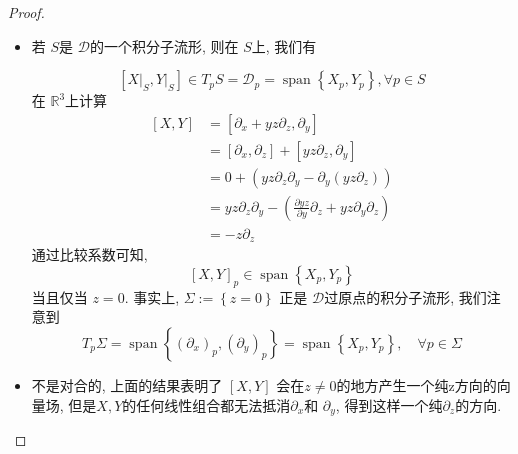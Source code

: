 \documentclass[../main.tex]{subfiles}
\begin{document}
\begin{proof}
    \begin{itemize}
        \item[a).] 若 \(  S  \)是 \(  \mathcal{D}  \)的一个积分子流形, 则在 \(  S  \)上, 我们有
        
    \[
    \left[ \left. X \right|_{S}, \left. Y \right|_{S} \right]\in T_{p}S= \mathcal{D}_{p}= \operatorname{span}\left\{ X_{p},Y_{p} \right\},\forall p\in S 
    \]
    在 \(  \mathbb{R} ^{3}  \)上计算
    \[
   \begin{aligned}
    \left[ X,Y \right]&= [ \partial _{x}+ yz \partial _{z}, \partial _{y}] \\&= [ \partial _{x}, \partial _{z}]+ \left[ yz \partial _{z}, \partial _{y} \right]\\&= 0+ \left( yz \partial _{z} \partial _{y}-  \partial _{y}\left( yz  \partial _{z} \right)  \right)\\&= yz \partial _{z} \partial _{y}- \left( \frac{\partial yz}{\partial y}  \partial _{z}+ yz  \partial _{y} \partial _{z} \right)\\&= -z \partial _{z}   
   \end{aligned} 
    \] 通过比较系数可知, 
    \[
    [X,Y]_{p}\in \operatorname{span}\left\{ X_{p},Y_{p} \right\}
    \]当且仅当  \(  z= 0  \). 
    事实上,  \(   \Sigma := \left\{ z= 0 \right\}  \)  正是 \(  \mathcal{D}  \)过原点的积分子流形, 我们注意到
    \[
    T_{p} \Sigma = \operatorname{span}\left\{  \left( \partial _{x} \right)_{p} , \left( \partial _{y}  \right)_{p} \right\}= \operatorname{span}\left\{ X_{p},Y_{p} \right\},\quad \forall p\in  \Sigma 
    \] 
    \item[b).] 不是对合的, 上面的结果表明了 \(  \left[ X,Y \right]   \) 会在\(  z\neq 0  \)的地方产生一个纯z方向的向量场, 但是\(  X,Y  \)的任何线性组合都无法抵消\(   \partial _{x}  \)和 \(   \partial _{y}  \), 得到这样一个纯\(   \partial _{z}  \)的方向.     
    \end{itemize}
\end{proof}
\end{document}
